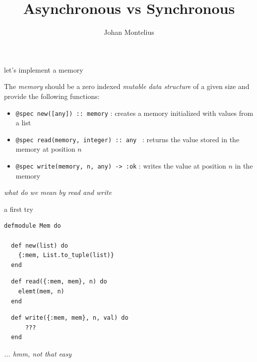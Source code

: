 

\title[ID1019 Asynchronous]{Asynchronous vs Synchronous}


\author{Johan Montelius}
\date{\semester}



\begin{frame}
\titlepage
\end{frame}

\begin{frame}{let's implement a memory}

  The {\em memory} should be a zero indexed {\em mutable data
    structure} of a given size and provide the following functions:

\pause\vspace{20pt}

\begin{itemize}
 \item {\tt @spec new([any]) :: memory} : creates a memory initialized with values from a list \pause
 \item {\tt @spec read(memory, integer) :: any } : returns the  value stored in the memory at position $n$ 
 \item {\tt @spec write(memory, n, any) -> :ok} : writes the value at position $n$ in the memory 
\end{itemize}

\pause\vspace{20pt}
{\em what do we mean by read and write}

\end{frame}

\begin{frame}[fragile]{a first try}

\begin{verbatim}
defmodule Mem do

  def new(list) do
    {:mem, List.to_tuple(list)}
  end
\end{verbatim} \pause
\begin{verbatim}
  def read({:mem, mem}, n) do
    elemt(mem, n)
  end
\end{verbatim} \pause
\begin{verbatim}
  def write({:mem, mem}, n, val) do
      ???
  end 
\end{verbatim}

\pause\vspace{20pt}
{\em ... hmm, not that easy}

\end{frame}

